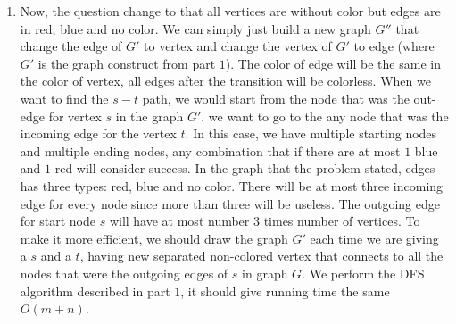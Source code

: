 \documentclass[11pt]{article}
\begin{document}
\begin{solution}
\begin{enumerate}
\item   
    Now, the question change to that all vertices are without color but edges are in red, blue and no color. We can simply just build a new graph $G''$ that change the edge of $G'$ to vertex and change the vertex of $G'$ to edge (where $G'$ is the graph construct from part $1$). The color of edge will be the same in the color of vertex, all edges after the transition will be colorless. When we want to find the $s-t$ path, we would start from the node that was the out-edge for vertex $s$ in the graph $G'$. we want to go to the any node that was the incoming edge for the vertex $t$. In this case, we have multiple starting nodes and multiple ending nodes, any combination that if there are at most $1$ blue and $1$ red will consider success. In the graph that the problem stated, edges has three types: red, blue and no color. There will be at most three incoming edge for every node since more than three will be useless. The outgoing edge for start node $s$ will have at most number $3$ times number of vertices. To make it more efficient, we should draw the graph $G'$ each time we are giving a $s$ and a $t$, having new separated non-colored vertex that connects to all the nodes that were the outgoing edges of $s$ in graph $G$. We perform the DFS algorithm described in part $1$, it should give running time the same $O(m+n)$.
\end{enumerate}
\end{solution}
\end{document}
